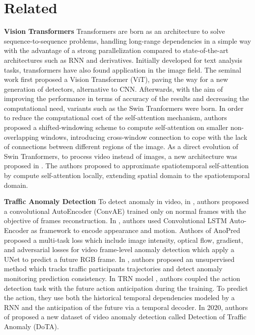 \section{Related}

\noindent\textbf{Vision Transformers}
Transformers \cite{vaswani2017attention} are born as an architecture to solve sequence-to-sequence problems, handling long-range dependencies in a simple way with the advantage of a strong parallelization compared to state-of-the-art architectures such as RNN and derivatives.
Initially developed for text analysis tasks, transformers have also found application in the image field.
The seminal work \cite{DBLP:conf/iclr/DosovitskiyB0WZ21} first proposed a Vision Transformer (ViT), paving the way for a new generation of detectors, alternative to CNN.
Afterwards, with the aim of improving the performance in terms of accuracy of the results and decreasing the computational need, variants such as the Swin Tranformers \cite{liu2021Swin} were born.
In order to reduce the computational cost of the self-attention mechanism, authors proposed a shifted-windowing scheme to compute self-attention on smaller non-overlapping windows, introducing cross-window connection to cope with the lack of connections between different regions of the image.
As a direct evolution of Swin Tranformers, to process video instead of images, a new architecture was proposed in \cite{liu_video_2022}.
The authors proposed to approximate spatiotemporal self-attention by compute self-attention locally, extending spatial domain to the spatiotemporal domain.

\noindent\textbf{Traffic Anomaly Detection}
To detect anomaly in video, in \cite{hasan2016learning}, authors proposed a convolutional AutoEncoder (ConvAE) trained only on normal frames with the objective of frames reconstruction.
In \cite{luo2017remembering, wang2018abnormal}, authors used Convolutional LSTM Auto-Encoder as framework to encode appearance and motion.
Authors of AnoPred \cite{liu2018future} proposed a multi-task loss which include image intensity, optical flow, gradient, and adversarial losses for video frame-level anomaly detection which apply a UNet to predict a future RGB frame.
In \cite{yao2019unsupervised}, authors proposed an unsupervised method which tracks traffic participants trajectories and detect anomaly monitoring prediction consistency.
In TRN model \cite{xu2019temporal}, authors coupled the action detection task with the future action anticipation during the training.
To predict the action, they use both the historical temporal dependencies modeled by a RNN and the anticipation of the future via a temporal decoder.
In 2020, authors of \cite{9712446} proposed a new dataset of video anomaly detection called Detection of Traffic Anomaly (DoTA).

